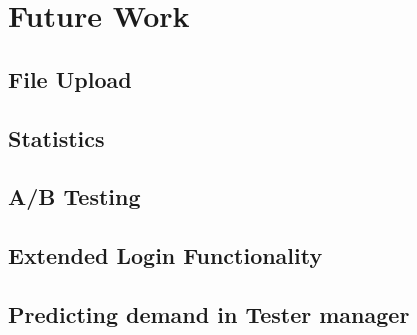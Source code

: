\chapter{Future Work}

\section{File Upload}


\section{Statistics}


\section{A/B Testing}


\section{Extended Login Functionality}


\section{Predicting demand in Tester manager}

